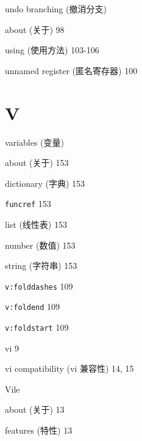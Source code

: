 \begin{multicols}{2}
\hangindent=2pc  undo branching (撤消分支) \par
\hangindent=2pc \quad about (关于) 98 \par
\hangindent=2pc \quad using (使用方法) 103-106 \par

\hangindent=2pc  unnamed register (匿名寄存器) 100

\hangindent=2pc  \section*{V}

\hangindent=2pc  variables (变量) \par
\hangindent=2pc \quad about (关于) 153 \par
\hangindent=2pc \quad dictionary (字典) 153 \par
\hangindent=2pc \quad \texttt{funcref} 153 \par
\hangindent=2pc \quad list (线性表) 153 \par
\hangindent=2pc \quad number (数值) 153 \par
\hangindent=2pc \quad string (字符串) 153 \par

\hangindent=2pc  \texttt{v:folddashes} 109

\hangindent=2pc  \texttt{v:foldend} 109

\hangindent=2pc  \texttt{v:foldstart} 109

\hangindent=2pc  vi 9

\hangindent=2pc  vi compatibility (vi 兼容性) 14, 15

\hangindent=2pc  Vile \par
\hangindent=2pc \quad about (关于) 13 \par
\hangindent=2pc \quad features (特性) 13 \par


\end{multicols}
